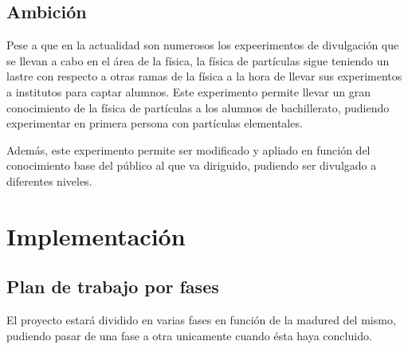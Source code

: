 \documentclass[11pt]{extarticle}
\begin{document}
			\subsection{Ambición}
				\label{SubSec:PreGeneral:Ambicion}
							 
				Pese a que en la actualidad son numerosos los expeerimentos de divulgación que se llevan a cabo en el área de la física, la física de partículas sigue teniendo un lastre con respecto a otras ramas de la física a la hora de llevar sus experimentos a institutos para captar alumnos. Este experimento permite llevar un gran conocimiento de la física de partículas a los alumnos de bachillerato, pudiendo experimentar en primera persona con partículas elementales.

				Además, este experimento permite ser modificado y apliado en función del conocimiento base del público al que va diriguido, pudiendo ser divulgado a diferentes niveles.
		
		
		\section{Implementación}
			\label{Sec:Imple}

			\subsection{Plan de trabajo por fases}
				\label{SubSec:Imple:trbjFases}

				El proyecto estará dividido en varias fases en función de la madured del mismo, pudiendo pasar de una fase a otra unicamente cuando ésta haya concluido.
\end{document}
